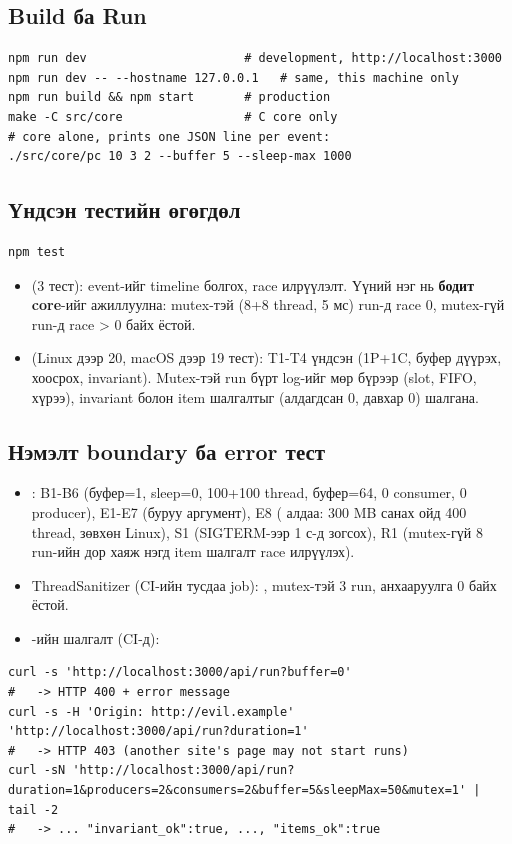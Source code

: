 \documentclass[12pt,a4paper]{article}
\begin{document}
\subsection{Build ба Run}
\begin{lstlisting}[style=shell]
npm run dev                      # development, http://localhost:3000
npm run dev -- --hostname 127.0.0.1   # same, this machine only
npm run build && npm start       # production
make -C src/core                 # C core only
# core alone, prints one JSON line per event:
./src/core/pc 10 3 2 --buffer 5 --sleep-max 1000
\end{lstlisting}

\subsection{Үндсэн тестийн өгөгдөл}
\begin{lstlisting}[style=shell]
npm test
\end{lstlisting}
\begin{itemize}
  \item {} (3 тест): event-ийг timeline болгох, race илрүүлэлт. Үүний нэг нь \textbf{бодит core}-ийг ажиллуулна: mutex-тэй (8+8 thread, 5 мс) run-д race 0, mutex-гүй run-д race > 0 байх ёстой.
  \item {} (Linux дээр 20, macOS дээр 19 тест): T1-T4 үндсэн (1P+1C, буфер дүүрэх, хоосрох, invariant). Mutex-тэй run бүрт log-ийг мөр бүрээр (slot, FIFO, хүрээ), invariant болон item шалгалтыг (алдагдсан 0, давхар 0) шалгана.
\end{itemize}

\subsection{Нэмэлт boundary ба error тест}
\begin{itemize}
  \item {}: B1-B6 (буфер=1, sleep=0, 100+100 thread, буфер=64, 0 consumer, 0 producer), E1-E7 (буруу аргумент), E8 ( алдаа: 300 MB санах ойд 400 thread, зөвхөн Linux), S1 (SIGTERM-ээр 1 с-д зогсох), R1 (mutex-гүй 8 run-ийн дор хаяж нэгд item шалгалт race илрүүлэх).
  \item ThreadSanitizer (CI-ийн тусдаа job): , mutex-тэй 3 run, анхааруулга 0 байх ёстой.
  \item {}-ийн шалгалт (CI-д):
\end{itemize}
\begin{lstlisting}[style=shell,breaklines=true]
curl -s 'http://localhost:3000/api/run?buffer=0'
#   -> HTTP 400 + error message
curl -s -H 'Origin: http://evil.example' 'http://localhost:3000/api/run?duration=1'
#   -> HTTP 403 (another site's page may not start runs)
curl -sN 'http://localhost:3000/api/run?duration=1&producers=2&consumers=2&buffer=5&sleepMax=50&mutex=1' | tail -2
#   -> ... "invariant_ok":true, ..., "items_ok":true
\end{lstlisting}
\end{document}
